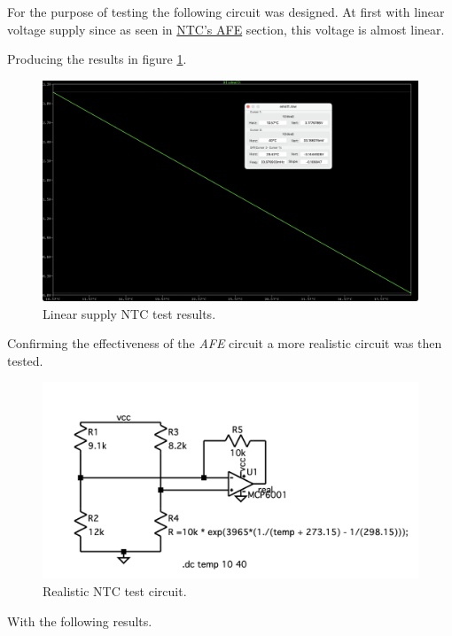 \documentclass[12pt]{article}
\begin{document}
    For the purpose of testing the following circuit was designed.
    At first with linear voltage supply since as seen in \hyperref[AFENTCOutV]{NTC's AFE} section, this voltage is almost linear.

    Producing the results in figure \ref{NTCLinTest}.
 
    \begin{figure}[H] 
        \centering
        \includegraphics*[scale = 0.3]{images/NTCLinearRes.png}
        \caption{Linear supply NTC test results.}
        \label{NTCLinTest}
    \end{figure}

    Confirming the effectiveness of the \textit{AFE} circuit a more realistic
    circuit was then tested.

    \begin{figure}[H] 
        \centering
        \includegraphics*[scale = 0.6]{images/NTCRealTb.png}
        \caption{Realistic NTC test circuit.}
        \label{wrap-fig:1}
    \end{figure}
    
    With the following results.
    
\end{document}
